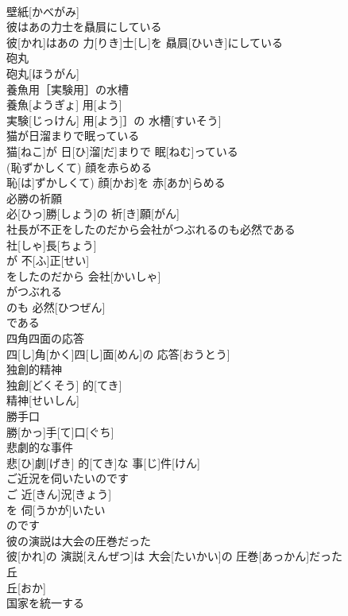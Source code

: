 \documentclass[8pt]{extreport}
\begin{document}
\begin{CJK}{UTF8}{min}
\\	壁紙[かべがみ]
\\	彼はあの力士を贔屓にしている	
\\	彼[かれ]はあの 力[りき]士[し]を 贔屓[ひいき]にしている
\\	砲丸	
\\	砲丸[ほうがん]
\\	養魚用［実験用］の水槽	
\\	養魚[ようぎょ] 用[よう]
\\	実験[じっけん] 用[よう]］の 水槽[すいそう]
\\	猫が日溜まりで眠っている	
\\	猫[ねこ]が 日[ひ]溜[だ]まりで 眠[ねむ]っている
\\	(恥ずかしくて) 顔を赤らめる	
\\	恥[は]ずかしくて) 顔[かお]を 赤[あか]らめる
\\	必勝の祈願	
\\	必[ひっ]勝[しょう]の 祈[き]願[がん]
\\	社長が不正をしたのだから会社がつぶれるのも必然である	
\\	社[しゃ]長[ちょう]
\\	が 不[ふ]正[せい]
\\	をしたのだから 会社[かいしゃ]
\\	がつぶれる 
\\	のも 必然[ひつぜん]
\\	である
\\	四角四面の応答	
\\	四[し]角[かく]四[し]面[めん]の 応答[おうとう]
\\	独創的精神	
\\	独創[どくそう] 的[てき]
\\	精神[せいしん]
\\	勝手口	
\\	勝[かっ]手[て]口[ぐち]
\\	悲劇的な事件	
\\	悲[ひ]劇[げき] 的[てき]な 事[じ]件[けん]
\\	ご近況を伺いたいのです	
\\	ご 近[きん]況[きょう]
\\	を 伺[うかが]いたい 
\\	のです
\\	彼の演説は大会の圧巻だった	
\\	彼[かれ]の 演説[えんぜつ]は 大会[たいかい]の 圧巻[あっかん]だった
\\	丘	
\\	丘[おか]
\\	国家を統一する	

\end{CJK}
\end{document}
